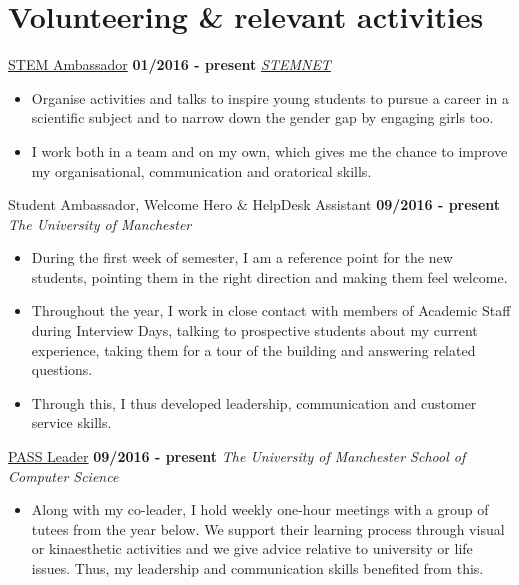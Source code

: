 \documentclass[]{friggeri-cv}
\begin{document}

\section{\color{red}Volunteering \color{gray} \& relevant activities}
\begin{entrylist}
  \entry
    {}
    {\href{http://www.stemnet.org.uk/ambassadors/}{STEM Ambassador}}
    {\textbf{01/2016 - present}}
    {\emph{\href{http://www.stemnet.org.uk/}{STEMNET}}}
    \begin{itemize}
        \item Organise activities and talks to inspire young students to pursue a career in a scientific subject and to narrow down the gender gap by engaging girls too.
        \item I work both in a team and on my own, which gives me the chance to improve my organisational, communication and oratorical skills.\\
    \end{itemize}
   \entry
    {}
    {Student Ambassador, Welcome Hero \& HelpDesk Assistant}
    {\textbf{09/2016 - present}}
    {\emph{The University of Manchester}}
    \begin{itemize}
        \item During the first week of semester, I am a reference point for the new students, pointing them in the right direction and making them feel welcome.
        \item Throughout the year, I work in close contact with members of Academic Staff during Interview Days, talking to prospective students about my current experience, taking them for a tour of the building and answering related questions.
        \item Through this, I thus developed leadership, communication and customer service skills.\\
    \end{itemize}
  \entry
    {}
    {\href{http://www.pass.manchester.ac.uk/}{PASS Leader}}
    {\textbf{09/2016 - present}}
    {\emph{The University of Manchester School of Computer Science}}
    \begin{itemize}
        \item Along with my co-leader, I hold weekly one-hour meetings with a group of tutees from the year below. We support their learning process through visual or kinaesthetic activities and we give advice relative to university or life issues. Thus, my leadership and communication skills benefited from this.\\

\end{itemize}
\end{entrylist}
\end{document}
